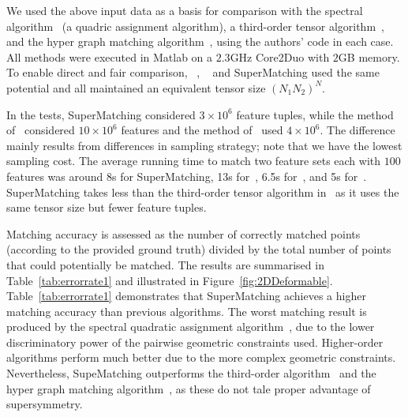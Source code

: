 We used the above input data as a basis for comparison with the spectral algorithm~\cite{Cour06} (a quadric assignment algorithm),
a third-order tensor algorithm~\cite{Duchenne09},
and the hyper graph matching algorithm~\cite{Zass08}, using the authors' code in each case.
All methods were executed in Matlab on a $2.3$GHz Core2Duo with $2$GB memory.
To enable direct and fair comparison,
~\cite{Duchenne09}, ~\cite{Zass08} and SuperMatching
used the same potential and all maintained an equivalent tensor size $(N_1N_2)^N$.

In the tests, SuperMatching considered $3\times 10^6$ feature tuples, while the method of~\cite{Duchenne09} considered $10\times 10^6$ features  and the method of~\cite{Zass08} used $4\times 10^6$.
The difference  mainly results from differences in sampling strategy; note that we have the lowest  sampling cost.
The average running time to match two feature sets each with $100$ features was around 8s for SuperMatching, 13s for~\cite{Duchenne09}, 6.5s for~\cite{Zass08}, and 5s for~\cite{Cour06}.
SuperMatching takes less  than the third-order tensor algorithm in~\cite{Duchenne09} as it uses the same tensor size but fewer feature tuples.

Matching accuracy is assessed as the number of correctly matched points (according to the provided ground truth) divided by the total number of points that could potentially be matched.
The results are summarised in Table~\ref{tab:errorrate1} and illustrated in Figure~\ref{fig:2DDeformable}.
Table~\ref{tab:errorrate1} demonstrates that SuperMatching achieves a higher matching accuracy than previous algorithms.
The worst matching result is produced by the spectral quadratic assignment algorithm~\cite{Cour06},
due to the lower discriminatory power of the pairwise geometric constraints used.
Higher-order algorithms perform much better due to the more complex geometric constraints.
Nevertheless, SupeMatching outperforms the third-order algorithm~\cite{Duchenne09} and the hyper graph matching algorithm~\cite{Zass08}, as these do not tale proper advantage of supersymmetry.

